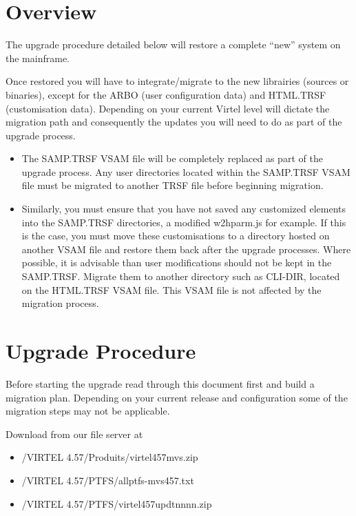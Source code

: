 \documentclass[letterpaper,10pt,english]{sphinxmanual}
\begin{document}
\section{Overview}
\label{\detokenize{Migration_Guide:overview}}
The upgrade procedure detailed below will restore a complete “new” system on the mainframe.

Once restored you will have to integrate/migrate to the new librairies (sources or binaries), except for the ARBO (user configuration data) and HTML.TRSF (customisation data). Depending on your current Virtel level will dictate the migration path and consequently the updates you will need to do as part of the upgrade process.
\begin{itemize}
\item {} 
The SAMP.TRSF VSAM file will be completely replaced as part of the upgrade process. Any user directories located within the SAMP.TRSF VSAM file must be migrated to another TRSF file before beginning migration.

\item {} 
Similarly, you must ensure that you have not saved any customized elements into the SAMP.TRSF directories, a modified w2hparm.js for example. If this is the case, you must move these customisations to a directory hosted on another VSAM file and restore them back after the upgrade processes. Where possible, it is advisable than user modifications should not be kept in the SAMP.TRSF. Migrate them to another directory such as CLI-DIR, located on the HTML.TRSF VSAM file. This VSAM file is not affected by the migration process.

\end{itemize}

\newpage


\section{Upgrade Procedure}
\label{\detokenize{Migration_Guide:upgrade-procedure}}\label{\detokenize{Migration_Guide:index-1}}
Before starting the upgrade read through this document first and build a migration plan. Depending on your current release and configuration some of the migration steps may not be applicable.

Download from our file server at 
\begin{itemize}
\item {} 
/VIRTEL 4.57/Produits/virtel457mvs.zip

\item {} 
/VIRTEL 4.57/PTFS/allptfs-mvs457.txt

\item {} 
/VIRTEL 4.57/PTFS/virtel457updtnnnn.zip

\end{itemize}
\end{document}
